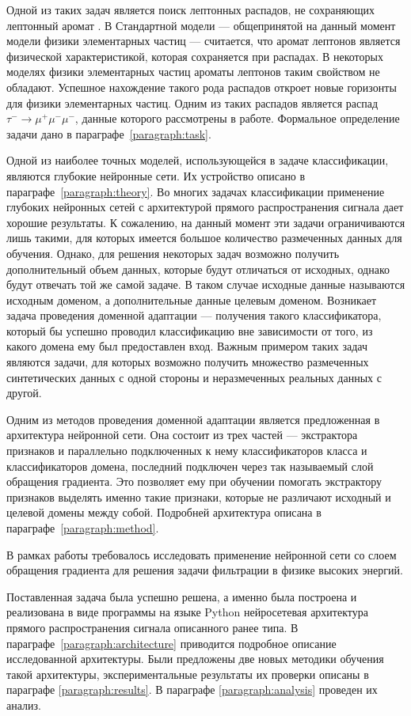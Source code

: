 \documentclass[14pt, a4paper]{extarticle}
\begin{document}
Одной из таких задач является поиск лептонных распадов, не сохраняющих лептонный аромат \cite{kaggle}. В Стандартной модели — общепринятой на данный момент модели физики элементарных частиц — считается, что аромат лептонов является физической характеристикой, которая сохраняется при распадах. В некоторых моделях физики элементарных частиц ароматы лептонов таким свойством не обладают. Успешное нахождение такого рода распадов откроет новые горизонты для физики элементарных частиц. Одним из таких распадов является распад $\tau^-\rightarrow\mu^+ \mu^- \mu^-$, данные которого рассмотрены в работе. Формальное определение задачи дано в параграфе~\ref{paragraph:task}.

Одной из наиболее точных моделей, использующейся в задаче классификации, являются глубокие нейронные сети. Их устройство описано в параграфе~\ref{paragraph:theory}. Во многих задачах классификации применение глубоких нейронных сетей с архитектурой прямого распространения сигнала дает хорошие результаты. К сожалению, на данный момент эти задачи ограничиваются лишь такими, для которых имеется большое количество размеченных данных для обучения.
Однако, для решения некоторых задач возможно получить дополнительный объем данных, которые будут отличаться от исходных, однако будут отвечать той же самой задаче. В таком случае исходные данные называются исходным доменом, а дополнительные данные целевым доменом. Возникает задача проведения доменной адаптации — получения такого классификатора, который бы успешно проводил классификацию вне зависимости от того, из какого домена ему был предоставлен вход. Важным примером таких задач являются задачи, для которых возможно получить множество размеченных синтетических данных с одной стороны и неразмеченных реальных данных с другой.

Одним из методов проведения доменной адаптации является предложенная в \cite{ganin} архитектура нейронной сети. Она состоит из трех частей — экстрактора признаков и параллельно подключенных к нему классификаторов класса и классификаторов домена, последний подключен через так называемый слой обращения градиента. Это позволяет ему при обучении помогать экстрактору признаков выделять именно такие признаки, которые не различают исходный и целевой домены между собой. Подробней архитектура описана в параграфе~\ref{paragraph:method}.

В рамках работы требовалось исследовать применение нейронной сети со слоем обращения градиента для решения задачи фильтрации в физике высоких энергий.

Поставленная задача была успешно решена, а именно была построена и реализована в виде программы на языке Python нейросетевая архитектура прямого распространения сигнала описанного ранее типа. В параграфе~\ref{paragraph:architecture} приводится подробное описание исследованной архитектуры. Были предложены две новых методики обучения такой архитектуры, экспериментальные результаты их проверки описаны в параграфе \ref{paragraph:results}. В параграфе \ref{paragraph:analysis} проведен их анализ.
\end{document}
